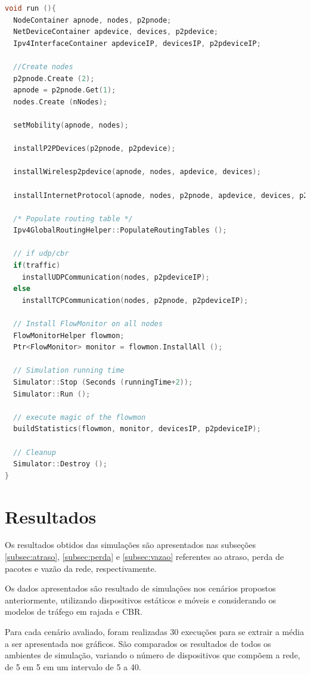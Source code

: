 \documentclass[12pt]{article}
\begin{document}
\begin{lstlisting}[language=C++, caption=Função responsável pelo fluxo de execução da simulação, label=alg:wifi_run]
void run (){
  NodeContainer apnode, nodes, p2pnode;
  NetDeviceContainer apdevice, devices, p2pdevice;
  Ipv4InterfaceContainer apdeviceIP, devicesIP, p2pdeviceIP;

  //Create nodes
  p2pnode.Create (2);
  apnode = p2pnode.Get(1);
  nodes.Create (nNodes);

  setMobility(apnode, nodes);

  installP2PDevices(p2pnode, p2pdevice);

  installWirelesp2pdevice(apnode, nodes, apdevice, devices);

  installInternetProtocol(apnode, nodes, p2pnode, apdevice, devices, p2pdevice, apdeviceIP, devicesIP, p2pdeviceIP);

  /* Populate routing table */
  Ipv4GlobalRoutingHelper::PopulateRoutingTables ();

  // if udp/cbr
  if(traffic)
    installUDPCommunication(nodes, p2pdeviceIP);
  else
    installTCPCommunication(nodes, p2pnode, p2pdeviceIP);

  // Install FlowMonitor on all nodes
  FlowMonitorHelper flowmon;
  Ptr<FlowMonitor> monitor = flowmon.InstallAll ();

  // Simulation running time
  Simulator::Stop (Seconds (runningTime+2));
  Simulator::Run ();

  // execute magic of the flowmon
  buildStatistics(flowmon, monitor, devicesIP, p2pdeviceIP);

  // Cleanup
  Simulator::Destroy ();
}
\end{lstlisting}


\section{Resultados}\label{sec::resultados}

Os resultados obtidos das simulações são apresentados nas subseções \ref{subsec:atraso}, \ref{subsec:perda} e \ref{subsec:vazao} referentes ao atraso, perda de pacotes e vazão da rede, respectivamente.

Os dados apresentados são resultado de simulações nos cenários propostos anteriormente, utilizando dispositivos estáticos e móveis e considerando os modelos de tráfego em rajada e CBR.

Para cada cenário avaliado, foram realizadas 30 execuções para se extrair a média a ser apresentada nos gráficos. São comparados os resultados de todos os ambientes de simulação, variando o número de dispositivos que compõem a rede, de 5 em 5 em um intervalo de 5 a 40.
\end{document}
